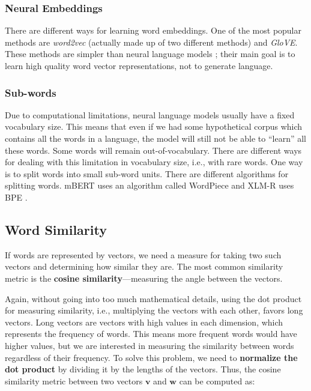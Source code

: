 \subsubsection{Neural Embeddings}

There are different ways for learning word embeddings. 
One of the most popular methods are \emph{word2vec} (actually made up of two different methods) and \emph{GloVE}. 
These methods are simpler than neural language models \autocite[111]{jurafsky-2019}; their main goal is to learn high quality word vector representations, not to generate language.

\subsubsection{Sub-words}\label{sec:subwords}
Due to computational limitations, neural language models usually have a fixed vocabulary size. 
This means that even if we had some hypothetical corpus which contains all the words in a language, the model will still not be able to \enquote{learn} all these words. 
Some words will remain out-of-vocabulary.
There are different ways for dealing with this limitation in vocabulary size, i.e., with rare words. 
One way is to split words into small sub-word units. 
There are different algorithms for splitting words. 
mBERT uses an algorithm called WordPiece \autocites{wu-2016-wordpiece,delvin-chang-2018-bert} and XLM-R uses BPE \autocites{conneau-etal-2020-xlm,sennrich-etal-2016-neural}.


\subsection{Word Similarity}
\label{sec:word-similarity}
If words are represented by vectors, we need a measure for taking two such vectors and determining how similar they are. 
The most common similarity metric is the \textbf{cosine similarity}---measuring the angle between the vectors. 

Again, without going into too much mathematical details, using the dot product for measuring similarity, i.e., multiplying the vectors with each other, favors long vectors. Long vectors are vectors with high values in each dimension, which represents the frequency of words. 
This means more frequent words would have higher values, but we are interested in measuring the similarity between words regardless of their frequency.
To solve this problem, we need to \textbf{normalize the dot product} by dividing it by the lengths of the vectors. 
Thus, the cosine similarity metric between two vectors $\mathbf{v}$ and $\mathbf{w}$ can be computed as:

